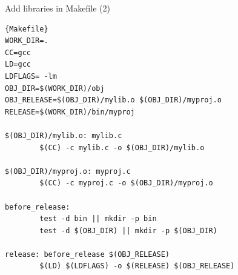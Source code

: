 \begin{frame}[fragile]{Add libraries in Makefile (2)}
\vspace{-0.2in}
\begin{lstlisting}[linewidth=0.95\linewidth, firstnumber= 1, xleftmargin=0.02\linewidth]{Makefile}
WORK_DIR=.
CC=gcc
LD=gcc
LDFLAGS= -lm
OBJ_DIR=$(WORK_DIR)/obj
OBJ_RELEASE=$(OBJ_DIR)/mylib.o $(OBJ_DIR)/myproj.o
RELEASE=$(WORK_DIR)/bin/myproj

$(OBJ_DIR)/mylib.o: mylib.c
        $(CC) -c mylib.c -o $(OBJ_DIR)/mylib.o

$(OBJ_DIR)/myproj.o: myproj.c
        $(CC) -c myproj.c -o $(OBJ_DIR)/myproj.o

before_release:
        test -d bin || mkdir -p bin
        test -d $(OBJ_DIR) || mkdir -p $(OBJ_DIR)

release: before_release $(OBJ_RELEASE)
        $(LD) $(LDFLAGS) -o $(RELEASE) $(OBJ_RELEASE)
\end{lstlisting}

\end{frame}
